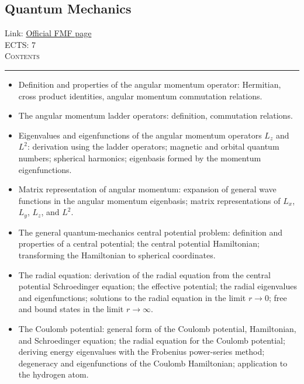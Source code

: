 \documentclass[11pt, a4paper]{article}
\newenvironment{course}[3]{
\subsection{#1}%
Link: \href{#2}{Official FMF page}\\%
ECTS: #3%
\vspace{1ex}
\\
{\large \textsc{Contents}}\\[-0.9ex]%
\rule{\textwidth}{0.5pt}
\vspace{-3ex}
}
{}
\newenvironment{chapter}[1]{
\begin{tcolorbox}[title=#1, breakable]
}
{\end{tcolorbox}}
\begin{document}
\begin{course}{Quantum Mechanics}{https://www.fmf.uni-lj.si/en/study-physics/programmes/1fiz/2020/7000777/courses/1156/}{7}
\begin{chapter}{Symmetries}
\begin{itemize}
        \end{itemize}
    \end{chapter}

    \begin{chapter}{Angular momentum}
        \begin{itemize}
        
            \item Definition and properties of the angular momentum operator: Hermitian, cross product identities, angular momentum commutation relations.

            \item The angular momentum ladder operators: definition, commutation relations.

            \item Eigenvalues and eigenfunctions of the angular momentum operators $ L_{z} $ and $ L^{2} $: derivation using the ladder operators; magnetic and orbital quantum numbers; spherical harmonics; eigenbasis formed by the momentum eigenfunctions.

            \item Matrix representation of angular momentum: expansion of general wave functions in the angular momentum eigenbasis; matrix representations of $ L_{x} $, $ L_{y} $, $ L_{z} $, and $ L^{2} $.
        
        \end{itemize}
    \end{chapter}

    \begin{chapter}{The central potential}
        \begin{itemize}

            \item The general quantum-mechanics central potential problem: definition and properties of a central potential; the central potential Hamiltonian; transforming the Hamiltonian to spherical coordinates.

            \item The radial equation: derivation of the radial equation from the central potential Schroedinger equation; the effective potential; the radial eigenvalues and eigenfunctions; solutions to the radial equation in the limit $ r \to 0 $; free and bound states in the limit $ r \to \infty $.

            \item The Coulomb potential: general form of the Coulomb potential, Hamiltonian, and Schroedinger equation; the radial equation for the Coulomb potential; deriving energy eigenvalues with the Frobenius power-series method; degeneracy and eigenfunctions of the Coulomb Hamiltonian; application to the hydrogen atom.


\end{itemize}
\end{chapter}
\end{course}
\end{document}
